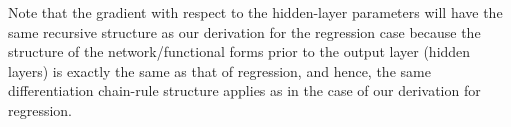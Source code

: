 \documentclass[10pt]{amsart}
\begin{document}
\begin{appendices}
Note that the gradient with respect to the hidden-layer parameters will have the same recursive structure as our derivation for the regression case because the structure of the network/functional forms prior to the output layer (hidden layers) is exactly the same as that of regression, and hence, the same differentiation chain-rule structure applies as in the case of our derivation for regression.











\end{appendices}
\end{document}
